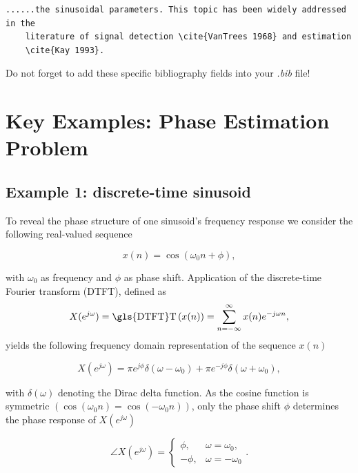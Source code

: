 \begin{mdframed}
	\begin{lstlisting}[language = Tex, caption={Add citations into your text}, linewidth = 150mm]
	......the sinusoidal parameters. This topic has been widely addressed in the 
	literature of signal detection \cite{VanTrees 1968} and estimation 
	\cite{Kay 1993}.
	\end{lstlisting}
	Do not forget to add these specific bibliography fields into your \emph{.bib} file!
\end{mdframed}

\section{Key Examples: Phase Estimation Problem}\label{ch3:PE1}
\subsection{Example 1: discrete-time sinusoid}
\noindent To reveal the phase structure of one sinusoid's frequency response we consider the following real-valued sequence

\begin{equation}
	\label{eq:c3.1}
	x(n)=\cos(\omega_0n+\phi),
\end{equation}

\noindent with $\omega_0$ as frequency and $\phi$ as phase shift. Application of the discrete-time Fourier transform (\gls{DTFT}), defined as
\begin{equation}\label{eq:c3.2}
X(e^{j\omega})=\text{\gls{DTFT}T}\left(x(n)\right)=\sum_{n=-\infty}^{\infty}x(n)e^{-j\omega n},
\end{equation}
yields the following frequency domain representation of the sequence $x(n)$

\begin{equation}\label{eq:c3.3}
X(e^{j\omega})=\pi e^{j\phi}\delta(\omega-\omega_0)+\pi e^{-j\phi}\delta(\omega+\omega_0),
\end{equation}

\noindent with $\delta(\omega)$ denoting the Dirac delta function. As the cosine function is symmetric $\left(\cos(\omega_0 n)=\cos(-\omega_0 n)\right)$, only the phase shift $\phi$ determines the phase response of $X(e^{j\omega})$

\begin{equation}\label{eq:c3.4}
\angle X(e^{j\omega})=\begin{cases}\phi, & \omega=\omega_0,\\
-\phi, & \omega=-\omega_0
\end{cases}.
\end{equation}

